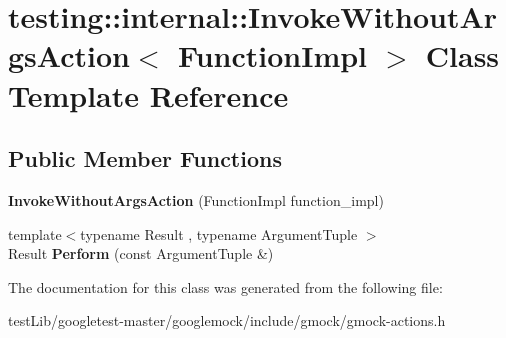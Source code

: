 \hypertarget{classtesting_1_1internal_1_1InvokeWithoutArgsAction}{}\section{testing\+:\+:internal\+:\+:Invoke\+Without\+Args\+Action$<$ Function\+Impl $>$ Class Template Reference}
\label{classtesting_1_1internal_1_1InvokeWithoutArgsAction}
\subsection*{Public Member Functions}
\begin{DoxyCompactItemize}
\item 
\mbox{\label{classtesting_1_1internal_1_1InvokeWithoutArgsAction_a05d4006d8ab70e78172bf678b1d15f18}} 
{\bfseries Invoke\+Without\+Args\+Action} (Function\+Impl function\+\_\+impl)
\item 
\mbox{\label{classtesting_1_1internal_1_1InvokeWithoutArgsAction_abdad2b7d19ff1cbd1d07a4bd585e3f4c}} 
{\footnotesize template$<$typename Result , typename Argument\+Tuple $>$ }\\Result {\bfseries Perform} (const Argument\+Tuple \&)
\end{DoxyCompactItemize}


The documentation for this class was generated from the following file\+:\begin{DoxyCompactItemize}
\item 
test\+Lib/googletest-\/master/googlemock/include/gmock/gmock-\/actions.\+h\end{DoxyCompactItemize}
